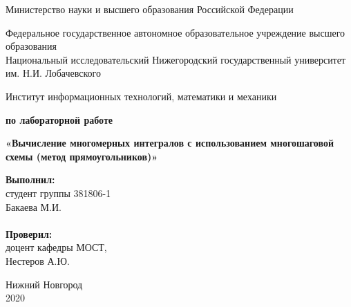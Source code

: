 \documentclass{report}
\begin{document}
\begin{titlepage}

\begin{center}
Министерство науки и высшего образования Российской Федерации
\end{center}

\begin{center}
Федеральное государственное автономное образовательное учреждение высшего образования \\
Национальный исследовательский Нижегородский государственный университет им. Н.И. Лобачевского
\end{center}

\begin{center}
Институт информационных технологий, математики и механики
\end{center}

\vspace{4em}

\begin{center}
\textbf{ по лабораторной работе} \\
\end{center}
\begin{center}
\textbf{\Large«Вычисление многомерных интегралов с использованием многошаговой схемы (метод прямоугольников)»} \\
\end{center}

\vspace{4em}

\newbox{\lbox}
\newlength{\maxl}
\setlength{\maxl}{\wd\lbox}
\hfill\parbox{7cm}{
\hspace*{5cm}\hspace*{-5cm}\textbf{Выполнил:} \\ студент группы 381806-1 \\ Бакаева М.И.\\
\\
\hspace*{5cm}\hspace*{-5cm}\textbf{Проверил:}\\ доцент кафедры МОСТ, \\ Нестеров А.Ю.\\
}
\vspace{\fill}

\begin{center} Нижний Новгород \\ 2020 \end{center}

\end{titlepage}
\end{document}
